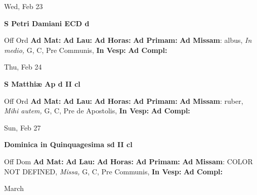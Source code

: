 \documentclass[10pt]{memoir}
\begin{document}
\begin{center}
\begin{minipage}{3.5in}
\vspace{2em}
\begin{center}Wed, Feb 23
\end{center}
\textbf{ \large S Petri Damiani ECD
\textnormal{\normalsize d}}

\begin{justify}Off Ord
\textbf{Ad Mat: }
\textbf{Ad Lau: }
\textbf{Ad Horas: }
\textbf{Ad Primam: }\textbf{Ad Missam}: albus, \textit{In medio,} G, C, Pre Communis, 
\textbf{In Vesp: }
\textbf{Ad Compl: }
\end{justify}
\end{minipage}
\end{center}

\begin{center}
\begin{minipage}{3.5in}
\vspace{2em}
\begin{center}Thu, Feb 24
\end{center}
\textbf{ \large S Matthiæ Ap
\textnormal{\normalsize d II cl}}

\begin{justify}Off Ord
\textbf{Ad Mat: }
\textbf{Ad Lau: }
\textbf{Ad Horas: }
\textbf{Ad Primam: }\textbf{Ad Missam}: ruber, \textit{Mihi autem,} G, C, Pre de Apostolis, 
\textbf{In Vesp: }
\textbf{Ad Compl: }
\end{justify}
\end{minipage}
\end{center}

\begin{center}
\begin{minipage}{3.5in}
\vspace{2em}
\begin{center}Sun, Feb 27
\end{center}
\textbf{ \large Dominica in Quinquagesima
\textnormal{\normalsize sd II cl}}

\begin{justify}Off Dom
\textbf{Ad Mat: }
\textbf{Ad Lau: }
\textbf{Ad Horas: }
\textbf{Ad Primam: }\textbf{Ad Missam}: COLOR NOT DEFINED, \textit{Missa,} G, C, Pre Communis, 
\textbf{In Vesp: }
\textbf{Ad Compl: }
\end{justify}
\end{minipage}
\end{center}

\begin{center}
\pagebreak
\thispagestyle{empty}
{\Huge March}
\end{center}
                    
\end{document}
